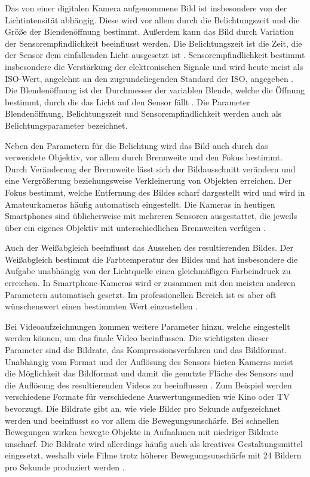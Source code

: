 Das von einer digitalen Kamera aufgenommene Bild ist insbesondere von der Lichtintensität abhängig.
Diese wird vor allem durch die Belichtungszeit und die Größe der Blendenöffnung bestimmt.
Außerdem kann das Bild durch Variation der Sensorempfindlichkeit beeinflusst werden.
Die Belichtungszeit ist die Zeit, die der Sensor dem einfallenden Licht ausgesetzt ist \cite[S. 390ff.]{Schmidt_Videotechnik}.
Sensorempfindlichkeit bestimmt insbesondere die Verstärkung der elektronischen Signale und wird heute meist als \acs{ISO}-Wert, angelehnt an den zugrundeliegenden Standard der \acf{ISO}, angegeben \cite[S. 412ff.]{Schmidt_Videotechnik}.
Die Blendenöffnung ist der Durchmesser der variablen Blende, welche die Öffnung bestimmt, durch die das Licht auf den Sensor fällt \cite[S. 444ff.]{Schmidt_Videotechnik}.
Die Parameter Blendenöffnung, Belichtungszeit und Sensorempfindlichkeit werden auch als Belichtungsparameter bezeichnet.

Neben den Parametern für die Belichtung wird das Bild auch durch das verwendete Objektiv, vor allem durch Brennweite und den Fokus bestimmt.
Durch Veränderung der Brennweite lässt sich der Bildausschnitt verändern und eine Vergrößerung beziehungsweise Verkleinerung von Objekten erreichen.
Der Fokus bestimmt, welche Entfernung des Bildes scharf dargestellt wird und wird in Amateurkameras häufig automatisch eingestellt.
Die Kameras in heutigen Smartphones sind üblicherweise mit mehreren Sensoren ausgestattet, die jeweils über ein eigenes Objektiv mit unterschiedlichen Brennweiten verfügen \cite[S. 499ff.]{Schmidt_Videotechnik}.

Auch der Weißabgleich beeinflusst das Aussehen des resultierenden Bildes.
Der Weißabgleich bestimmt die Farbtemperatur des Bildes und hat insbesondere die Aufgabe unabhängig von der Lichtquelle einen gleichmäßigen Farbeindruck zu erreichen.
In Smartphone-Kameras wird er zusammen mit den meisten anderen Parametern automatisch gesetzt.
Im professionellen Bereich ist es aber oft wünschenswert einen bestimmten Wert einzustellen \cite[S. 434ff.]{Schmidt_Videotechnik}.


Bei Videoaufzeichnungen kommen weitere Parameter hinzu, welche eingestellt werden können, um das finale Video beeinflussen.
Die wichtigsten dieser Parameter sind die Bildrate, das Kompressionsverfahren und das Bildformat.
Unabhängig vom Format und der Auflösung des Sensors bieten Kameras meist die Möglichkeit das Bildformat und damit die genutzte Fläche des Sensors und die Auflösung des resultierenden Videos zu beeinflussen \cite[S. 422]{Schmidt_Videotechnik}.
Zum Beispiel werden verschiedene Formate für verschiedene Auswertungsmedien wie Kino oder TV bevorzugt.
Die Bildrate gibt an, wie viele Bilder pro Sekunde aufgezeichnet werden und beeinflusst so vor allem die Bewegungsunschärfe.
Bei schnellen Bewegungen wirken bewegte Objekte in Aufnahmen mit niedriger Bildrate unscharf.
Die Bildrate wird allerdings häufig auch als kreatives Gestaltungsmittel eingesetzt, weshalb viele Filme trotz höherer Bewegungsunschärfe mit 24 Bildern pro Sekunde produziert werden \cite[S. 174f.]{Schmidt_Videotechnik}.

